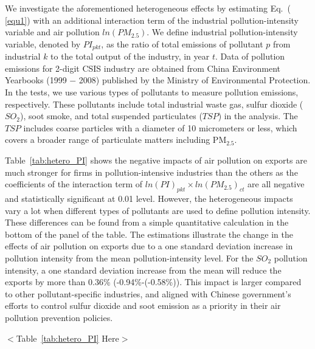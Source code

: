 \documentclass[12pt]{article}
\begin{document}
  We investigate the aforementioned heterogeneous effects by estimating Eq.~(%
\ref{equ1}) with an additional interaction term of the industrial
pollution-intensity variable and air pollution $ln(PM_{2.5})$. We define industrial pollution-intensity
  variable, denoted by $PI_{pkt}$, as the ratio of total emissions of
  pollutant $p$ from industrial $k$ to the total output of the industry, in year $t$. Data of pollution emissions for 2-digit CSIS industry are obtained 
  from China Environment Yearbooks (1999 $-$ 2008) published by the Ministry of Environmental Protection. In the tests, we use various types of pollutants to measure pollution emissions, respectively. These pollutants include total industrial waste gas, sulfur dioxide ($SO_{2}$), soot smoke, and total suspended particulates ($TSP$) in the analysis. The
  $TSP$ includes coarse particles with a diameter of 10 micrometers
  or less, which covers a broader range of particulate matters including $\mathrm{PM_{2.5}}$.
  
  Table~\ref{tab:hetero_PI} shows the negative impacts of air pollution
  on exports are much stronger for firms in pollution-intensive industries than the
  others as the coefficients of the interaction term of $ln(PI)_{pkt}\times ln(PM_{2.5})_{ct}$ 
  are all negative and statistically significant at 0.01 level. However, the heterogeneous impacts vary a 
  lot when different types of pollutants are used to define pollution intensity. These differences can be found from a simple quantitative calculation in the bottom of the panel of the table. The estimations
  illustrate the change in the effects of air pollution on exports due to a one standard deviation increase in pollution intensity from the mean pollution-intensity level. For the $SO_{2}$ pollution intensity, a one standard deviation increase from the mean will reduce the exports by more than 0.36\% (-0.94\%-(-0.58\%)). This impact is larger compared to other pollutant-specific industries, and aligned with Chinese government's efforts to control sulfur dioxide and soot emission as a priority in their air pollution prevention policies.
  

  \begin{center}
    $<$Table~\ref{tab:hetero_PI} Here$>$
    \end{center}
\end{document}
